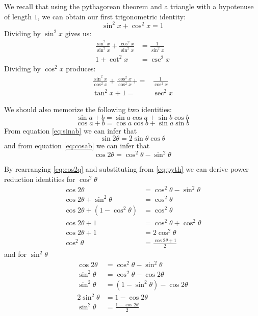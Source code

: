 We recall that using the pythagorean theorem and a triangle with a hypotenuse of length $1$, we can obtain our first trigonometric identity:
\begin{equation}
	\sin^2x+\cos^2x=1
  \label{eq:pyth}
\end{equation}
Dividing by $\sin^2x$ gives us:
\begin{align}
\frac{\sin^2x}{\sin^2x}+\frac{\cos^2x}{\sin^2x}&=\frac{1}{\sin^2x} \nonumber \\
	1+\cot^2x&=\csc^2x
\end{align}
Dividing by $\cos^2x$ produces:
\begin{align}
  \frac{\sin^2x}{\cos^2x}+\frac{\cos^2x}{\cos^2x}+=&\frac{1}{\cos^2x} \nonumber \\
	\tan^2x+1=&\sec^2x
\end{align}

We should also memorize the following two identities:
\begin{equation}
  \sin{a+b}=\sin a \cos a + \sin b \cos b
  \label{eq:sinab}
\end{equation}
\begin{equation}
  \cos{a+b}=\cos a \cos b + \sin a \sin b
  \label{eq:cosab}
\end{equation}
From equation \eqref{eq:sinab} we can infer that
\begin{equation}
  \sin{2\theta}=2 \sin \theta \cos \theta
  \label{eq:sin2q}
\end{equation}
and from equation \eqref{eq:cosab} we can infer that
\begin{equation}
  \cos{2\theta}=\cos^2 \theta - \sin^2\theta
  \label{eq:cos2q}
\end{equation}

By rearranging \eqref{eq:cos2q} and substituting from \eqref{eq:pyth} we can derive power reduction identities for $\cos^2 \theta$
\begin{align}
  \cos{2\theta} &= \cos^2 \theta - \sin^2\theta \nonumber \\
  \cos{2\theta} + \sin^2\theta &= \cos^2\theta \nonumber \\
  \cos{2\theta} + (1-\cos^2 \theta) &=\cos^2\theta \nonumber \\
  \cos{2\theta} + 1 &= \cos^2\theta + \cos^2\theta \nonumber \\
  \cos{2\theta}+1 &= 2 \cos^2\theta \nonumber \\
  \cos^2\theta &= \frac{\cos{2\theta}+1}{2}
  \label{eq:cossqq}
\end{align}
and for $\sin^2 \theta$
\begin{align}
  \cos{2\theta} &= \cos^2 \theta - \sin^2\theta \nonumber \\
  \sin^2 \theta &= \cos^2 \theta - \cos{2 \theta} \nonumber \\
  \sin^2 \theta &= (1-\sin^2 \theta) - \cos{2 \theta} \nonumber \\
  2 \sin^2 \theta &= 1-\cos{2\theta} \nonumber \\
  \sin^2 \theta &= \frac{1-\cos{2\theta}}{2}
  \label{eq:sinsqq}
\end{align}


